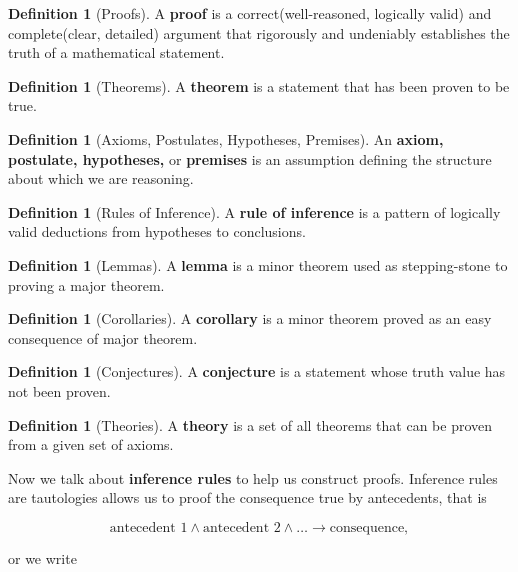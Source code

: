 \documentclass[12pt,a4paper]{report}
\theoremstyle{definition}
\newtheorem{definition}[theorem]{Definition}
\theoremstyle{remark}
\begin{document}
\begin{definition}[Proofs]
    A \textbf{proof} is a correct(well-reasoned, logically valid) and complete(clear, detailed) argument that rigorously and undeniably establishes the truth of a mathematical statement.
\end{definition}

\begin{definition}[Theorems]
    A \textbf{theorem} is a statement that has been proven to be true.
\end{definition}

\begin{definition}[Axioms, Postulates, Hypotheses, Premises]
    An \textbf{axiom, postulate, hypotheses,} or \textbf{premises} is an assumption defining the structure about which we are reasoning.
\end{definition}

\begin{definition}[Rules of Inference]
    A \textbf{rule of inference} is a pattern of logically valid deductions from hypotheses to conclusions.
\end{definition}

\begin{definition}[Lemmas]
    A \textbf{lemma} is a minor theorem used as stepping-stone to proving a major theorem.
\end{definition}

\begin{definition}[Corollaries]
    A \textbf{corollary} is a minor theorem proved as an easy consequence of major theorem.
\end{definition}

\begin{definition}[Conjectures]
    A \textbf{conjecture} is a statement whose truth value has not been proven.
\end{definition}

\begin{definition}[Theories]
    A \textbf{theory} is a set of all theorems that can be proven from a given set of axioms.
\end{definition}

Now we talk about \textbf{inference rules} to help us construct proofs. Inference rules are tautologies allows us to proof the consequence true by antecedents, that is

\[\text{antecedent 1} \land \text{antecedent 2} \land \ldots \rightarrow \text{consequence},\]

\noindent or we write
\end{document}
